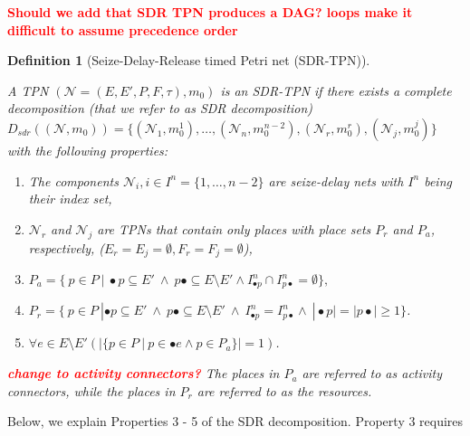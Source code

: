 \documentclass[11pt]{article}
\newcommand{\todo}[1]{\textcolor{red}{\bf {#1}}}
\newtheorem{mydef}{Definition}
\begin{document}
\todo{Should we add that SDR TPN produces a DAG? loops make it difficult to assume precedence order}
\begin{mydef}  [Seize-Delay-Release timed Petri net (SDR-TPN)]  \label{def:sdr-tpn}
	\begin{sloppypar} A TPN $(\mathcal{N} = (E, E',P, F, \tau), m_0)$ is an SDR-TPN if there exists a complete decomposition (that we refer
		to as SDR decomposition) $D_{sdr}((\mathcal{N}, m_0)) = \{(\mathcal{N}_1, m_0^1), \ldots, (\mathcal{N}_n, m_0^{n-2}) , (\mathcal{N}_r, m_0^{r}), (\mathcal{N}_j, m_0^{j})\}$ with the following properties: \end{sloppypar}
	
	\begin{enumerate} 
		\item The components $\mathcal{N}_i, i \in I^n = \{1,\ldots, n-2\}$ are seize-delay nets with $I^n$ being their index set,
		\item $\mathcal{N}_r$ and $\mathcal{N}_j$ are TPNs that contain only places with place sets $P_r$ and $P_a$, respectively, ($E_r = E_j = \emptyset, F_r = F_j = \emptyset$), 
		
		
		\item $P_a = \{ \ p \in P \ | \ \bullet p \subseteq E' \ \land \ p\bullet \subseteq E \setminus E' \land I_{\bullet p}^n \cap I_{p \bullet}^n = \emptyset \},$
		
		\item $P_r = \{ \ p \in P \ |  \bullet p \subseteq E' \ \land \ p\bullet \subseteq E \setminus E' \ \land \ I_{\bullet p}^n = I_{p \bullet}^n  \land \ |\bullet p| = |p \bullet| \geq 1\}$.
		
		\item $\forall e \in E \setminus E'(|\{p \in P \ | \ p \in \bullet e \land p \in P_a   \}| =1)$.
		
	\end{enumerate}
	
	\noindent \todo{change to activity connectors?} The places in $P_a$ are referred to as activity connectors, while  
	the places in $P_r$ are referred to as the resources. 
	\label{SDRTPN}
\end{mydef} \noindent Below, we explain Properties 3 - 5
of the SDR decomposition. Property 3 requires 
\end{document}
